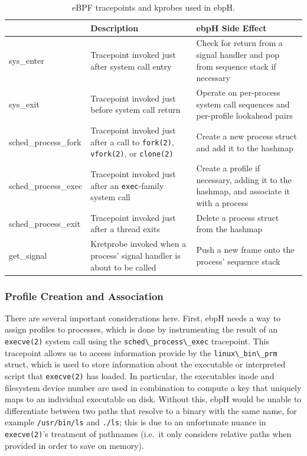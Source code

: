\documentclass[
  12pt]{findlay}
\newcommand{\passthrough}[1]{#1}
\begin{document}
\begin{table}
    \caption{eBPF tracepoints and kprobes used in ebpH.}
    \label{ebph-tracepoints}
    \begin{tabular}{>{\ttfamily}lp{2.4in}p{2.4in}}
        \toprule
        \multicolumn{1}{l}{Tracepoint/Kprobe} & Description & ebpH Side Effect\\
        \midrule
        sys\_enter & Tracepoint invoked just after system call entry &
            Check for return from a signal handler and pop from sequence stack if necessary\\
        sys\_exit & Tracepoint invoked just before system call return &
            Operate on per-process system call sequences and per-profile lookahead pairs\\
        sched\_process\_fork & Tracepoint invoked just after a call to \texttt{fork(2)},
            \texttt{vfork(2)}, or \texttt{clone(2)} &
            Create a new process struct and add it to the hashmap\\
        sched\_process\_exec & Tracepoint invoked just after an \texttt{exec}-family system call&
            Create a profile if necessary, adding it to the hashmap, and associate it with a process\\
        sched\_process\_exit & Tracepoint invoked just after a thread exits &
            Delete a process struct from the hashmap\\
        get\_signal & Kretprobe invoked when a process' signal handler is about to be called &
            Push a new frame onto the process' sequence stack\\
        \bottomrule
    \end{tabular}
\end{table}

\hypertarget{profile-creation-and-association}{%
\subsubsection{Profile Creation and
Association}\label{profile-creation-and-association}}

There are several important considerations here. First, ebpH needs a way
to assign profiles to processes, which is done by instrumenting the
result of an \passthrough{\lstinline!execve(2)!} system call using the
\passthrough{\lstinline!sched\_process\_exec!} tracepoint. This
tracepoint allows us to access information provide by the
\passthrough{\lstinline!linux\_bin\_prm!} struct, which is used to store
information about the executable or interpreted script that
\passthrough{\lstinline!execve(2)!} has loaded. In particular, the
executables inode and filesystem device number are used in combination
to compute a key that uniquely maps to an individual executable on disk.
Without this, ebpH would be unable to differentiate between two paths
that resolve to a binary with the same name, for example
\passthrough{\lstinline!/usr/bin/ls!} and
\passthrough{\lstinline!./ls!}; this is due to an unfortunate nuance in
\passthrough{\lstinline!execve(2)!}'s treatment of pathnames (i.e.~it
only considers relative paths when provided in order to save on memory).
\end{document}
